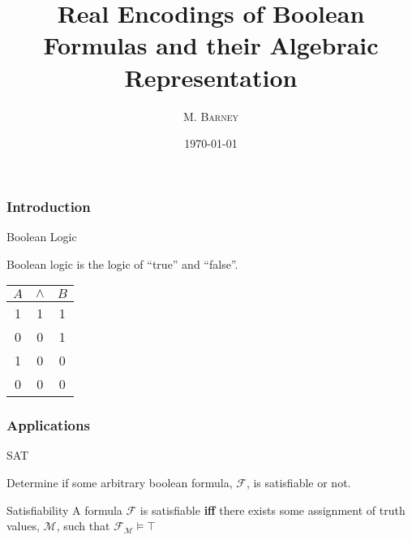 \documentclass{beamer}
\title[Real Encodings]{Real Encodings of Boolean Formulas and their Algebraic Representation}
\author{\textsc{M. Barney}}
\institute[U of New Mexico]
{
University of New Mexico \\
\medskip
{\emph{mbunm12@cs.unm.edu}}
}
\date{\today}
\begin{document}
\begin{frame}
\titlepage
\end{frame}

\begin{frame}
\frametitle{Introduction}
\begin{block}
{Boolean Logic} 

Boolean logic is the logic of ``true'' and ``false''.

\begin{center}
\begin{tabular}{|c|c|c|}\hline
\(A\) & \( \land\) & \( B\) \\ \hline
  1   &      1     &    1   \\ \hline
  0   &      0     &    1   \\ \hline
  1   &      0     &    0   \\ \hline
  0   &      0     &    0   \\ \hline
\end{tabular}
\end{center}


\end{block}
\end{frame}

\begin{frame}
\frametitle{Applications}
\begin{block}
{SAT} 

Determine if some arbitrary boolean formula, \(\mathcal{F}\), is satisfiable or not.

\end{block}


\begin{alertblock}
{Satisfiability}
A formula \(\mathcal{F}\) is satisfiable \textbf{iff} there exists some assignment of truth values, \(\mathcal{M}\), such that \(\mathcal{F}_{\mathcal{M}} \models \top\)
\end{alertblock}

\end{frame}
\end{document}
